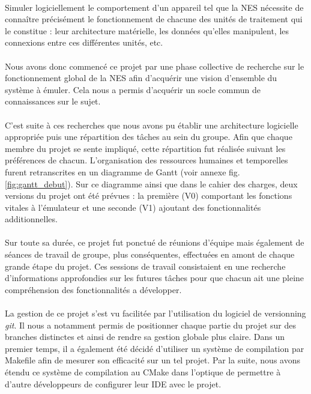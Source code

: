 \paragraph{}

Simuler logiciellement le comportement d'un appareil tel que la NES nécessite de connaître précisément le fonctionnement de chacune des unités de traitement qui le constitue : leur architecture matérielle, les données qu'elles manipulent, les connexions entre ces différentes unités, etc.

\paragraph{}
Nous avons donc commencé ce projet par une phase collective de recherche sur le fonctionnement global de la NES afin d'acquérir une vision d'ensemble du système à émuler. Cela nous a permis d'acquérir un socle commun de connaissances sur le sujet.

\paragraph{}
C'est suite à ces recherches que nous avons pu établir une architecture logicielle appropriée puis une répartition des tâches au sein du groupe. Afin que chaque membre du projet se sente impliqué, cette répartition fut réalisée suivant les préférences de chacun. L'organisation des ressources humaines et temporelles furent retranscrites en un diagramme de Gantt (voir annexe fig. \ref{fig:gantt_debut}). Sur ce diagramme ainsi que dans le cahier des charges, deux versions du projet ont été prévues : la première (V0) comportant les fonctions vitales à l'émulateur et une seconde (V1) ajoutant des fonctionnalités additionnelles.

\paragraph{}
Sur toute sa durée, ce projet fut ponctué de réunions d'équipe mais également de séances de travail de groupe, plus conséquentes, effectuées en amont de chaque grande étape du projet. Ces sessions de travail consistaient en une recherche d'informations approfondies sur les futures tâches pour que chacun ait une pleine compréhension des fonctionnalités a développer.

\paragraph{}
La gestion de ce projet s'est vu facilitée par l'utilisation du logiciel de versionning \emph{git}. Il nous a notamment permis de positionner chaque partie du projet sur des branches distinctes et ainsi de rendre sa gestion globale plus claire. Dans un premier temps, il a également été décidé d'utiliser un système de compilation par Makefile afin de mesurer son efficacité sur un tel projet. Par la suite, nous avons étendu ce système de compilation au CMake dans l'optique de permettre à d'autre développeurs de configurer leur IDE avec le projet.
